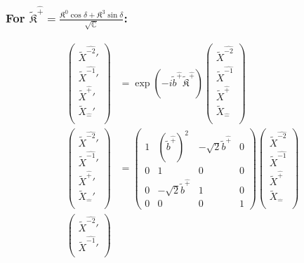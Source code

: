 \documentclass[]{article}
\numberwithin{equation}{section}
\begin{document}
{{\subsubsection{For $\tilde{\mathfrak{K}}^{\hat{+}}=\frac{\mathfrak{K}^0\cos{\delta}+\mathfrak{K}^3\sin{\delta}}{\sqrt{\mathbb{C}}}$:}
\begin{align}
\begin{pmatrix}
    \tilde{X}^{\hat{-2}}'\\
    \tilde{X}^{\hat{-1}}'\\
    \tilde{X}^{\hat{+}}'\\
    \tilde{X}_{\hat{-}}'\\
    \end{pmatrix}&= \exp{(-i\tilde{b}^{\hat{+}}\tilde{\mathfrak{K}}^{\hat{+}})}\begin{pmatrix}
    \tilde{X}^{\hat{-2}}\\
    \tilde{X}^{\hat{-1}}\\
    \tilde{X}^{\hat{+}}\\
    \tilde{X}_{\hat{-}}\\
    \end{pmatrix}\\
    \begin{pmatrix}
    \tilde{X}^{\hat{-2}}'\\
    \tilde{X}^{\hat{-1}}'\\
    \tilde{X}^{\hat{+}}'\\
    \tilde{X}_{\hat{-}}'\\
    \end{pmatrix}&= \begin{pmatrix}
        1&(\tilde{b}^{\hat{+}})^2&-\sqrt{2}\tilde{b}^{\hat{+}}&0\\
        0&1&0&0\\
        0&-\sqrt{2}\tilde{b}^{\hat{+}}&1&0\\
        0&0&0&1
    \end{pmatrix}\begin{pmatrix}
    \tilde{X}^{\hat{-2}}\\
    \tilde{X}^{\hat{-1}}\\
    \tilde{X}^{\hat{+}}\\
    \tilde{X}_{\hat{-}}\\
    \end{pmatrix}\\
    \begin{pmatrix}
    \tilde{X}^{\hat{-2}}'\\
    \tilde{X}^{\hat{-1}}'\\

\end{pmatrix}
\end{align}}}
\end{document}
